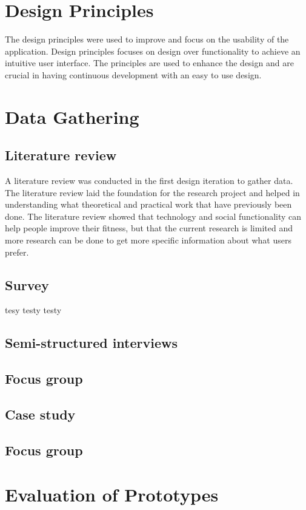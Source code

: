 \section{Design Principles}
The design principles were used to improve and focus on the usability of the application. Design principles focuses on design over functionality to achieve an intuitive user interface. The principles are used to enhance the design and are crucial in having continuous development with an easy to use design.

\section{Data Gathering}

\subsection{Literature review}
A literature review was conducted in the first design iteration to gather data. The literature review laid the foundation for the research project and helped in understanding what theoretical and practical work that have previously been done. The literature review showed that technology and social functionality can help people improve their fitness, but that the current research is limited and more research can be done to get more specific information about what users prefer. 
\subsection{Survey}
tesy testy testy
\subsection{Semi-structured interviews}

\subsection{Focus group}

\subsection{Case study}

\subsection{Focus group}

\section{Evaluation of Prototypes}
